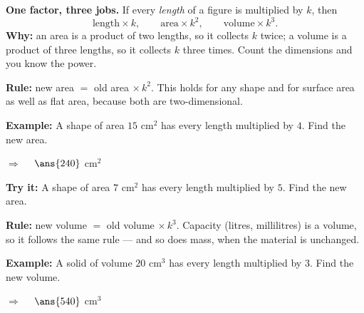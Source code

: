 \documentclass[12pt]{article}
\begin{document}

\begin{formulabox}
\textbf{One factor, three jobs.} If every \emph{length} of a figure is multiplied by $k$, then
\[ \text{length} \times k, \qquad \text{area} \times k^2, \qquad \text{volume} \times k^3. \]
\textbf{Why:} an area is a product of two lengths, so it collects $k$ twice; a volume is a product of three lengths, so it collects $k$ three times. Count the dimensions and you know the power.
\end{formulabox}


\begin{formulabox}
\textbf{Rule:} new area $=$ old area $\times\, k^2$. This holds for any shape and for surface area as well as flat area, because both are two-dimensional.
\end{formulabox}

\begin{examplebox}
\textbf{Example:} \quad A shape of area $15$ cm$^2$ has every length multiplied by $4$. Find the new area.

$\Rightarrow\quad$ $\ans{240}$ cm$^2$
\end{examplebox}

\begin{tryitbox}
\textbf{Try it:} \quad A shape of area $7$ cm$^2$ has every length multiplied by $5$. Find the new area.\\[2pt]
\end{tryitbox}


\begin{formulabox}
\textbf{Rule:} new volume $=$ old volume $\times\, k^3$. Capacity (litres, millilitres) is a volume, so it follows the same rule --- and so does mass, when the material is unchanged.
\end{formulabox}

\begin{examplebox}
\textbf{Example:} \quad A solid of volume $20$ cm$^3$ has every length multiplied by $3$. Find the new volume.

$\Rightarrow\quad$ $\ans{540}$ cm$^3$
\end{examplebox}
\end{document}

